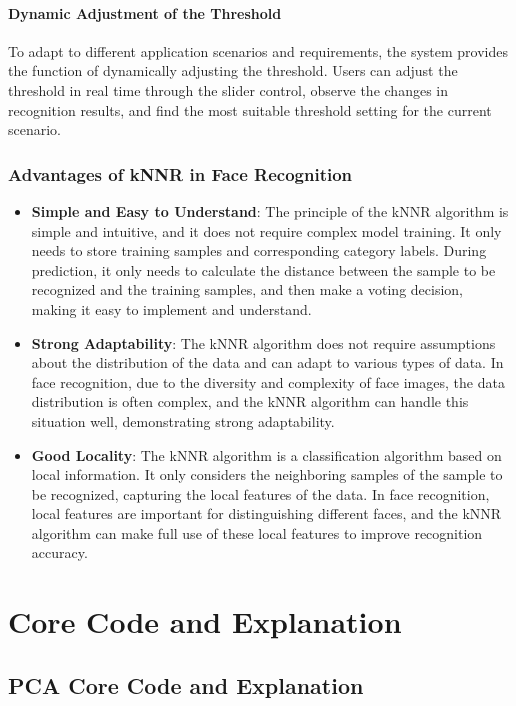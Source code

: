 \documentclass{article}
\begin{document}
\paragraph{Dynamic Adjustment of the Threshold}
To adapt to different application scenarios and requirements, the system provides the function of dynamically adjusting the threshold. Users can adjust the threshold in real time through the slider control, observe the changes in recognition results, and find the most suitable threshold setting for the current scenario.

\subsubsection{Advantages of kNNR in Face Recognition}
\begin{itemize}
    \item \textbf{Simple and Easy to Understand}: The principle of the kNNR algorithm is simple and intuitive, and it does not require complex model training. It only needs to store training samples and corresponding category labels. During prediction, it only needs to calculate the distance between the sample to be recognized and the training samples, and then make a voting decision, making it easy to implement and understand.
    \item \textbf{Strong Adaptability}: The kNNR algorithm does not require assumptions about the distribution of the data and can adapt to various types of data. In face recognition, due to the diversity and complexity of face images, the data distribution is often complex, and the kNNR algorithm can handle this situation well, demonstrating strong adaptability.
    \item \textbf{Good Locality}: The kNNR algorithm is a classification algorithm based on local information. It only considers the neighboring samples of the sample to be recognized, capturing the local features of the data. In face recognition, local features are important for distinguishing different faces, and the kNNR algorithm can make full use of these local features to improve recognition accuracy.
\end{itemize}
\newpage
\section{Core Code and Explanation}

\subsection{PCA Core Code and Explanation}
\end{document}
